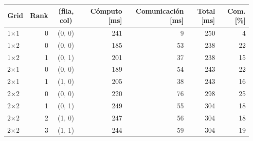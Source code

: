 \begin{tabular}{lrcrrrr}
\toprule
Grid & Rank & (fila, col) & Cómputo [ms] & Comunicación [ms] & Total [ms] & Com. [\%] \\
\midrule
1$\times$1 & 0 & (0, 0) & 241 & 9 & 250 & 4 \\
1$\times$2 & 0 & (0, 0) & 185 & 53 & 238 & 22 \\
1$\times$2 & 1 & (0, 1) & 201 & 37 & 238 & 15 \\
2$\times$1 & 0 & (0, 0) & 189 & 54 & 243 & 22 \\
2$\times$1 & 1 & (1, 0) & 205 & 38 & 243 & 16 \\
2$\times$2 & 0 & (0, 0) & 220 & 76 & 298 & 25 \\
2$\times$2 & 1 & (0, 1) & 249 & 55 & 304 & 18 \\
2$\times$2 & 2 & (1, 0) & 247 & 56 & 304 & 18 \\
2$\times$2 & 3 & (1, 1) & 244 & 59 & 304 & 19 \\
\bottomrule
\end{tabular}
